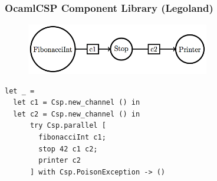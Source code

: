 \documentclass{beamer}
\begin{document}
\begin{frame}[fragile]
  \frametitle{OcamlCSP Component Library (Legoland)}
  \begin{figure}[htp]
    \begin{center}
      \includegraphics[width=8cm,keepaspectratio=true]{figures/fib2.png}
    \end{center}
  \end{figure}
\tiny
\begin{verbatim}
let _ = 
  let c1 = Csp.new_channel () in
  let c2 = Csp.new_channel () in
      try Csp.parallel [
        fibonacciInt c1;
        stop 42 c1 c2;
        printer c2
      ] with Csp.PoisonException -> ()
\end{verbatim}
\normalsize
\end{frame}

%
%
%
%
\end{document}
